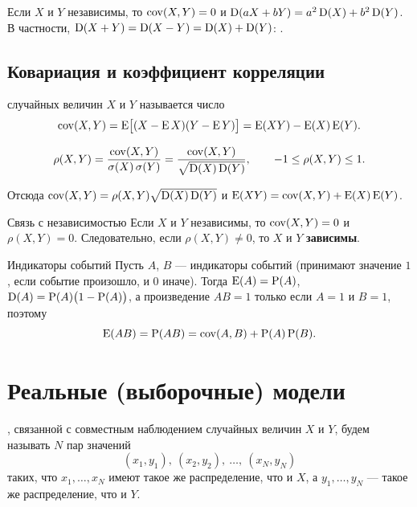 \documentclass[11pt,a4paper]{article}
\begin{document}
\begin{zam}
Если $X$ и $Y$ независимы, то $\operatorname{cov}(X,Y)=0$ и $\operatorname{D}(aX+bY)=a^2\operatorname{D}(X)+b^2\operatorname{D}(Y)$.
В частности, $\operatorname{D}(X+Y)=\operatorname{D}(X-Y)=\operatorname{D}(X)+\operatorname{D}(Y)$: .
\end{zam}

\subsection{Ковариация и коэффициент корреляции}

\begin{opr}[ковариация]
 случайных величин $X$ и $Y$ называется число
\[
\operatorname{cov}(X,Y)=\operatorname{E}\bigl[(X-\operatorname{E} X)(Y-\operatorname{E} Y)\bigr]=\operatorname{E}(XY)-\operatorname{E}(X)\operatorname{E}(Y).
\]
\end{opr}

\begin{opr}
\[
\rho(X,Y)=\frac{\operatorname{cov}(X,Y)}{\sigma(X)\,\sigma(Y)}=\frac{\operatorname{cov}(X,Y)}{\sqrt{\operatorname{D}(X)\operatorname{D}(Y)}},\qquad -1\le\rho(X,Y)\le1.
\]
\end{opr}

Отсюда $\operatorname{cov}(X,Y)=\rho(X,Y)\sqrt{\operatorname{D}(X)\operatorname{D}(Y)}$ и $\operatorname{E}(XY)=\operatorname{cov}(X,Y)+\operatorname{E}(X)\operatorname{E}(Y)$.

\begin{kob}{Связь с независимостью}
Если $X$ и $Y$ независимы, то $\operatorname{cov}(X,Y)=0$ и $\rho(X,Y)=0$.
Следовательно, если $\rho(X,Y)\ne0$, то $X$ и $Y$ \textbf{зависимы}.
\end{kob}

\begin{kvb}{Индикаторы событий}
Пусть $A$, $B$ — индикаторы событий (принимают значение $1$, если событие произошло, и $0$ иначе).
Тогда $\operatorname{E}(A)=\operatorname{P}(A)$, $\operatorname{D}(A)=\operatorname{P}(A)\bigl(1-\operatorname{P}(A)\bigr)$, а произведение $AB=1$ только если $A=1$ и $B=1$, поэтому
\[
\operatorname{E}(AB)=\operatorname{P}(AB)=\operatorname{cov}(A,B)+\operatorname{P}(A)\operatorname{P}(B).
\]
\end{kvb}

\section{Реальные (выборочные) модели}

\begin{opr}[выборка]
, связанной с совместным наблюдением случайных величин $X$ и $Y$, будем называть $N$ пар значений
\[
(x_1,y_1),\ (x_2,y_2),\ \dots,\ (x_N,y_N)
\]
таких, что $x_1,\dots,x_N$ имеют такое же распределение, что и $X$, а $y_1,\dots,y_N$ — такое же распределение, что и $Y$.
\end{opr}
\end{document}
